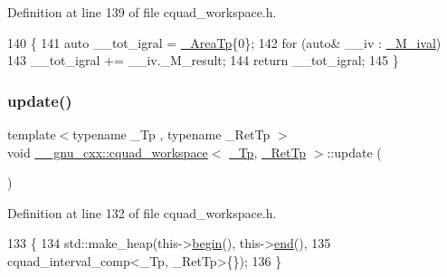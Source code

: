 Definition at line 139 of file cquad\+\_\+workspace.\+h.


\begin{DoxyCode}
140       \{
141         \textcolor{keyword}{auto} \_\_tot\_igral = \hyperlink{struct____gnu__cxx_1_1cquad__workspace_a8eede64f10ac7bbf817992cd3d06fa8f}{\_AreaTp}\{0\};
142         \textcolor{keywordflow}{for} (\textcolor{keyword}{auto}& \_\_iv : \hyperlink{struct____gnu__cxx_1_1cquad__workspace_a46edeb05c52f2a406dc582b404fe83e6}{\_M\_ival})
143           \_\_tot\_igral += \_\_iv.\_M\_result;
144         \textcolor{keywordflow}{return} \_\_tot\_igral;
145       \}
\end{DoxyCode}
\mbox{\label{struct____gnu__cxx_1_1cquad__workspace_a40032babd2a04f33cd7c37d9c80d1d50}} 
\subsubsection{\texorpdfstring{update()}{update()}}
{\footnotesize\ttfamily template$<$typename \+\_\+\+Tp , typename \+\_\+\+Ret\+Tp $>$ \\
void \hyperlink{struct____gnu__cxx_1_1cquad__workspace}{\+\_\+\+\_\+gnu\+\_\+cxx\+::cquad\+\_\+workspace}$<$ \hyperlink{namespace____gnu__cxx_a3b19a9c800ca194374ef9172290f7d79}{\+\_\+\+Tp}, \hyperlink{namespace____gnu__cxx_a886e03ece3d53ff7fa6c098a40f93fa5}{\+\_\+\+Ret\+Tp} $>$\+::update (\begin{DoxyParamCaption}{ }\end{DoxyParamCaption})\hspace{0.3cm}{\ttfamily [inline]}}



Definition at line 132 of file cquad\+\_\+workspace.\+h.


\begin{DoxyCode}
133       \{
134         std::make\_heap(this->\hyperlink{struct____gnu__cxx_1_1cquad__workspace_adf18a306dbf58cb00b4c6254266816bc}{begin}(), this->\hyperlink{struct____gnu__cxx_1_1cquad__workspace_a61729a1acaa035013ebb0ed6e4ffcbf4}{end}(),
135                        cquad\_interval\_comp<\_Tp, \_RetTp>\{\});
136       \}
\end{DoxyCode}


